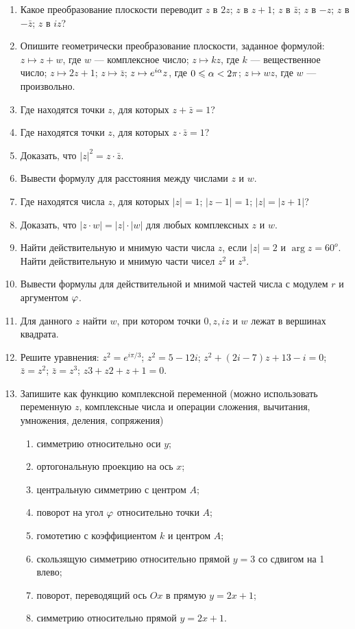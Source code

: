 \begin{enumerate}
\item Какое преобразование плоскости переводит \ipunkt $z$ в $2z$;
\ipunkt  $z$ в $z + 1$;
\ipunkt  $z$ в $\bar z$;
\ipunkt  $z$ в $-z$;
\ipunkt  $z$ в $-\bar z$;
\ipunkt  $z$ в $iz$?
\item Опишите геометрически преобразование плоскости, заданное формулой:
\ipunkt $z \mapsto z + w$, где $w$ --- комплексное число;
\ipunkt $z \mapsto kz$, где $k$ --- вещественное число;
\ipunkt $z \mapsto 2z + 1$;
\ipunkt $z \mapsto \bar z$;
\ipunkt $z \mapsto e^{i\alpha}z$, где $0 \leqslant \alpha < 2\pi$;
\ipunkt $z \mapsto wz$, где $w$ --- произвольно.

\item Где находятся точки $z$, для которых $z + \bar z= 1$?
\item Где находятся точки $z$, для которых $z \cdot \bar z = 1$?
\item Доказать, что $|z|^2 = z \cdot \bar z$.
\item Вывести формулу для расстояния между числами $z$ и $w$.
\item Где находятся числа $z$, для которых
\ipunkt $|z| = 1$;
\ipunkt $|z - 1| = 1$;
\ipunkt $|z| = |z + 1|$?
\item Доказать, что $|z \cdot w| = |z| \cdot |w|$ для любых комплексных $z$ и $w$.
\item Найти действительную и мнимую части числа $z$, если $|z| = 2$ и $\arg z = 60^o$.
Найти действительную и мнимую части чисел $z^2$ и  $z^3$.
\item Вывести формулы для действительной и мнимой частей числа с модулем $r$ и аргументом $\varphi$.

\item Для данного $z$ найти $w$, при котором точки $0, z, iz$ и $w$ лежат в вершинах квадрата.

\item Решите уравнения:
\ipunkt $z^2 = e^{i\pi/3}$;
\ipunkt $z^2 = 5 - 12i$;
\ipunkt $z^2 + (2i - 7)z + 13 - i = 0$; 
\ipunkt $\bar z = z^2$; 
\ipunkt $\bar z = z^3$;
\ipunkt $z 3 + z 2 + z + 1 = 0$.

\item Запишите как функцию комплексной переменной (можно использовать переменную $z$, 
комплексные числа и операции сложения, вычитания, умножения, деления, сопряжения)
\begin{enumerate}
\item симметрию относительно оси $y$;
\item ортогональную проекцию на ось $x$;
\item центральную симметрию с центром $A$;
\item поворот на угол $\varphi$ относительно точки $A$;
\item гомотетию с коэффициентом $k$ и центром $A$;
\item скользящую симметрию относительно прямой $y = 3$ со сдвигом на 1 влево;
\item поворот, переводящий ось $Ox$ в прямую $y = 2x + 1$;
\item симметрию относительно прямой $y = 2x + 1$.
\end{enumerate}


\end{enumerate}
